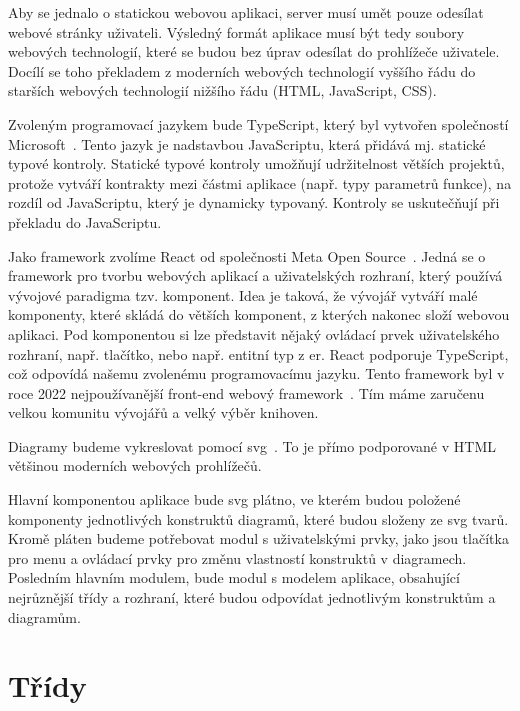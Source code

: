 Aby se jednalo o statickou webovou aplikaci, server musí umět pouze odesílat webové stránky uživateli.
Výsledný formát aplikace musí být tedy soubory webových technologií, které se budou bez úprav odesílat do prohlížeče uživatele.
Docílí se toho překladem z moderních webových technologií vyššího řádu do starších webových technologií nižšího řádu (HTML, JavaScript, CSS).

Zvoleným programovací jazykem bude TypeScript, který byl vytvořen společností Microsoft~\cite{microsoft_typescriptjavascript_2023}.
Tento jazyk je nadstavbou JavaScriptu, která přidává mj. statické typové kontroly.
Statické typové kontroly umožňují udržitelnost větších projektů, protože vytváří kontrakty mezi částmi aplikace (např. typy parametrů funkce), na rozdíl od JavaScriptu, který je dynamicky typovaný.
Kontroly se uskutečňují při překladu do JavaScriptu.

Jako framework zvolíme React od společnosti Meta Open Source~\cite{react_2023}.
Jedná se o framework pro tvorbu webových aplikací a uživatelských rozhraní, který používá vývojové paradigma tzv. komponent.
Idea je taková, že vývojář vytváří malé komponenty, které skládá do větších komponent, z kterých nakonec složí webovou aplikaci.
Pod komponentou si lze představit nějaký ovládací prvek uživatelského rozhraní, např. tlačítko, nebo např. entitní typ z \acrshort{er}.
React podporuje TypeScript, což odpovídá našemu zvolenému programovacímu jazyku.
Tento framework byl v roce 2022 nejpoužívanější front-end webový framework~\cite{stackoverflow_developersurvey_2022}.
Tím máme zaručenu velkou komunitu vývojářů a velký výběr knihoven.

Diagramy budeme vykreslovat pomocí \acrfull{svg}~\cite{brinza_svg_2018}.
To je přímo podporované v HTML většinou moderních webových prohlížečů.

Hlavní komponentou aplikace bude \acrshort{svg} plátno, ve kterém budou položené komponenty jednotlivých konstruktů diagramů, které budou složeny ze \acrshort{svg} tvarů.
Kromě pláten budeme potřebovat modul s uživatelskými prvky, jako jsou tlačítka pro menu a ovládací prvky pro změnu vlastností konstruktů v diagramech.
Posledním hlavním modulem, bude modul s modelem aplikace, obsahující nejrůznější třídy a rozhraní, které budou odpovídat jednotlivým konstruktům a diagramům.

\section{Třídy}

